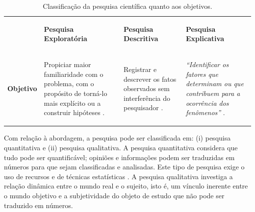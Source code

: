 \begin{table}[h!]
 \centering
 \caption{Classificação da pesquisa científica quanto aos objetivos.}
 \label{tab:classificacao_pesquisa}
 {\renewcommand\arraystretch{0.25}
 \begin{tabular}{ l l l l }
  \hline
    \multicolumn{1}{p{1.883cm}}{\begin{center} 
\end{center}} &
    \multicolumn{1}{p{3.517cm}}{\begin{center}\textbf{Pesquisa Exploratória}
\end{center}} &
    \multicolumn{1}{p{3.600cm}}{\begin{center}\textbf{Pesquisa Descritiva}
\end{center}} &
    \multicolumn{1}{p{3.583cm}}{\begin{center}\textbf{Pesquisa Explicativa}
\end{center}}
  \\  
  \cline{1-1}\cline{2-2}\cline{3-3}\cline{4-4}  
    \multicolumn{1}{p{1.883cm}}{\begin{center}\textbf{Objetivo}
\end{center}} &
    \multicolumn{1}{p{3.517cm}}{\begin{center}Propiciar maior familiaridade com o problema, com o propósito de torná-lo mais explícito ou a construir hipóteses \cite[pág. 41]{gil2002}.
\end{center}} &
    \multicolumn{1}{p{3.600cm}}{\begin{center}Registrar e descrever os fatos observados sem interferência do pesquisador \cite[pág. 52]{prodanov2013}.
\end{center}} &
    \multicolumn{1}{p{3.583cm}}{\begin{center}\textit{``Identificar os fatores que determinam ou que contribuem para a ocorrência dos fenômenos”} \cite[pág. 42]{gil2002}.
\end{center}}
  \\  
  \hline

 \end{tabular} }
\end{table}

Com relação à abordagem, a pesquisa pode ser classificada em: (i) pesquisa quantitativa e (ii) pesquisa qualitativa. A pesquisa quantitativa considera que tudo pode ser quantificável; opiniões e informações podem ser traduzidas em números para que sejam classificadas e analisadas. Este tipo de pesquisa exige o uso de recursos e de técnicas estatísticas \cite{prodanov2013}. A pesquisa qualitativa investiga a relação dinâmica entre o mundo real e o sujeito, isto é, um vínculo inerente entre o mundo objetivo e a subjetividade do objeto de estudo que não pode ser traduzido em números. 

